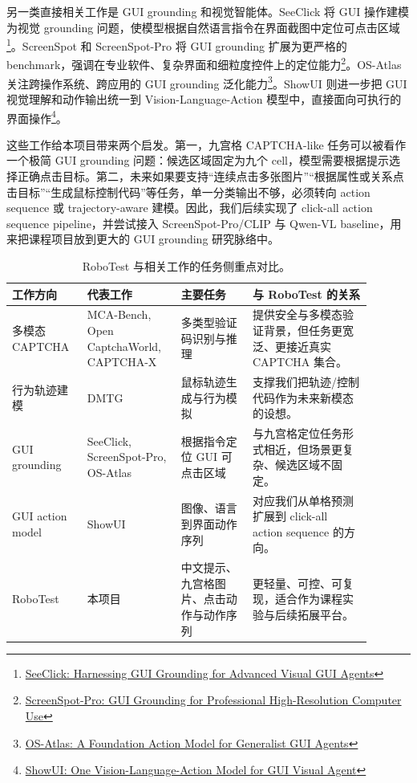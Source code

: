 \documentclass[UTF8,a4paper,12pt,fontset=fandol]{ctexart}
\begin{document}
另一类直接相关工作是 GUI grounding 和视觉智能体。SeeClick 将 GUI 操作建模为视觉 grounding 问题，使模型根据自然语言指令在界面截图中定位可点击区域\footnote{\href{https://arxiv.org/abs/2401.10935}{SeeClick: Harnessing GUI Grounding for Advanced Visual GUI Agents}}。ScreenSpot 和 ScreenSpot-Pro 将 GUI grounding 扩展为更严格的 benchmark，强调在专业软件、复杂界面和细粒度控件上的定位能力\footnote{\href{https://arxiv.org/abs/2504.07981}{ScreenSpot-Pro: GUI Grounding for Professional High-Resolution Computer Use}}。OS-Atlas 关注跨操作系统、跨应用的 GUI grounding 泛化能力\footnote{\href{https://arxiv.org/abs/2410.23218}{OS-Atlas: A Foundation Action Model for Generalist GUI Agents}}。ShowUI 则进一步把 GUI 视觉理解和动作输出统一到 Vision-Language-Action 模型中，直接面向可执行的界面操作\footnote{\href{https://arxiv.org/abs/2411.17465}{ShowUI: One Vision-Language-Action Model for GUI Visual Agent}}。

这些工作给本项目带来两个启发。第一，九宫格 CAPTCHA-like 任务可以被看作一个极简 GUI grounding 问题：候选区域固定为九个 cell，模型需要根据提示选择正确点击目标。第二，未来如果要支持“连续点击多张图片”“根据属性或关系点击目标”“生成鼠标控制代码”等任务，单一分类输出不够，必须转向 action sequence 或 trajectory-aware 建模。因此，我们后续实现了 click-all action sequence pipeline，并尝试接入 ScreenSpot-Pro/CLIP 与 Qwen-VL baseline，用来把课程项目放到更大的 GUI grounding 研究脉络中。

\begin{table}[H]
  \centering
  \caption{RoboTest 与相关工作的任务侧重点对比。}
  \label{tab:related-work}
  \scriptsize
  \begin{tabular}{p{0.18\linewidth}p{0.23\linewidth}p{0.18\linewidth}p{0.30\linewidth}}
    \toprule
    \rowcolor{tablehead}
    工作方向 & 代表工作 & 主要任务 & 与 RoboTest 的关系 \\
    \midrule
    多模态 CAPTCHA & MCA-Bench, Open CaptchaWorld, CAPTCHA-X & 多类型验证码识别与推理 & 提供安全与多模态验证背景，但任务更宽泛、更接近真实 CAPTCHA 集合。\\
    行为轨迹建模 & DMTG & 鼠标轨迹生成与行为模拟 & 支撑我们把轨迹/控制代码作为未来新模态的设想。\\
    GUI grounding & SeeClick, ScreenSpot-Pro, OS-Atlas & 根据指令定位 GUI 可点击区域 & 与九宫格定位任务形式相近，但场景更复杂、候选区域不固定。\\
    GUI action model & ShowUI & 图像、语言到界面动作序列 & 对应我们从单格预测扩展到 click-all action sequence 的方向。\\
    RoboTest & 本项目 & 中文提示、九宫格图片、点击动作与动作序列 & 更轻量、可控、可复现，适合作为课程实验与后续拓展平台。\\
    \bottomrule
  \end{tabular}
\end{table}
\end{document}
